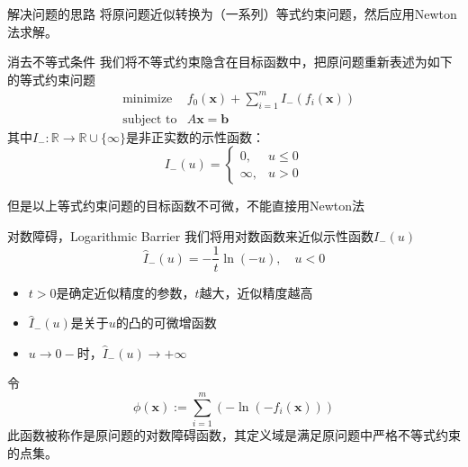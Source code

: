 
\begin{frame}

\begin{block}{解决问题的思路}
将原问题近似转换为（一系列）等式约束问题，然后应用Newton法求解。
\end{block}

\end{frame}


\begin{frame}

\begin{block}{消去不等式条件}
我们将不等式约束隐含在目标函数中，把原问题重新表述为如下的等式约束问题
\begin{eqnarray*}
& \text{minimize} & f_0(\mathbf{x}) + \sum\limits_{i=1}^m I_-(f_i(\mathbf{x})) \\
& \text{subject to} & A\mathbf{x} = \mathbf{b}
\end{eqnarray*}
其中$I_-: \mathbb{R} \to \mathbb{R}\cup\{\infty\}$是非正实数的示性函数：
\[
I_-(u) = \begin{cases}
0, & u \le 0 \\
\infty, & u > 0
\end{cases}
\]

\vspace{1em}
\pause

但是以上等式约束问题的目标函数不可微，不能直接用Newton法
\end{block}

\end{frame}


\begin{frame}

\begin{block}{对数障碍，Logarithmic Barrier}
我们将用对数函数来近似示性函数$I_-(u)$
\[\widehat{I}_-(u) = -\dfrac{1}{t}\ln(-u), \quad u < 0\]
\vspace{-1em}
\begin{itemize}
\item $t>0$是确定近似精度的参数，$t$越大，近似精度越高
\item $\widehat{I}_-(u)$是关于$u$的凸的可微增函数
\item $u\to 0-$时，$\widehat{I}_-(u)\to +\infty$
\end{itemize}

\vspace{1em}

令
\[\phi(\mathbf{x}) := \sum\limits_{i=1}^m \left( -\ln(-f_i(\mathbf{x})) \right)\]
此函数被称作是原问题的对数障碍函数，其定义域是满足原问题中严格不等式约束的点集。
\end{block}

\end{frame}


